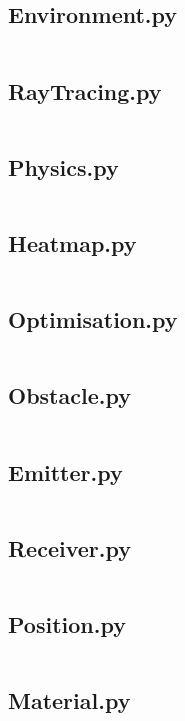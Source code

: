 \subsection*{Environment.py}
\inputminted[linenos, breaklines]{python}{Python/environment.py}

\subsection*{RayTracing.py}
\inputminted[linenos, breaklines]{python}{Python/raytracing2.py}

\subsection*{Physics.py}
\inputminted[linenos, breaklines]{python}{Python/physics2.py}

\subsection*{Heatmap.py}
\inputminted[linenos, breaklines]{python}{Python/heatmap.py}

\subsection*{Optimisation.py}
\inputminted[linenos, breaklines]{python}{Python/optimisation.py}

\subsection*{Obstacle.py}
\inputminted[linenos, breaklines]{python}{Python/obstacle.py}

\subsection*{Emitter.py}
\inputminted[linenos, breaklines]{python}{Python/emitter.py}

\subsection*{Receiver.py}
\inputminted[linenos, breaklines]{python}{Python/receiver.py}

\subsection*{Position.py}
\inputminted[linenos, breaklines]{python}{Python/position.py}

\subsection*{Material.py}
\inputminted[linenos, breaklines]{python}{Python/material.py}


